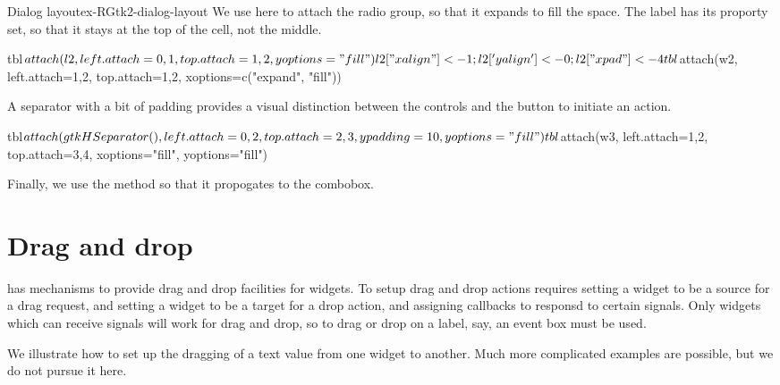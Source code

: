 \begin{example}{Dialog layout}{ex-RGtk2-dialog-layout}
We use  here to attach the radio group, so that it
expands to fill the space. The label has its  proporty
set, so that it stays at the top of the cell, not the middle.
\begin{Schunk}
\begin{Sinput}
 tbl$attach(l2, left.attach=0,1, top.attach=1,2, yoptions="fill")
 l2["xalign"] <- 1; l2['yalign'] <- 0; l2["xpad"] <- 4
 tbl$attach(w2, left.attach=1,2, top.attach=1,2, xoptions=c("expand", "fill"))
\end{Sinput}
\end{Schunk}
A separator with a bit of padding provides a visual distinction
between the controls and the button to initiate an action.
\begin{Schunk}
\begin{Sinput}
 tbl$attach(gtkHSeparator(),left.attach=0,2, top.attach=2,3, ypadding=10, yoptions="fill")
 tbl$attach(w3, left.attach=1,2, top.attach=3,4, xoptions="fill", yoptions="fill")
\end{Sinput}
\end{Schunk}
Finally, we use the  method so that it propogates to the combobox.
\begin{Schunk}
\end{Schunk}
\end{example}



\section{Drag and drop}
\label{sec:RGtk2:dnd}


\GTK\/ has mechanisms to provide drag and drop facilities for
widgets. To setup drag and drop actions requires setting a widget to
be a source for a drag request, and setting a widget to be a target
for a drop action, and assigning callbacks to responsd to certain
signals.  Only widgets which can receive signals will work for drag
and drop, so to drag or drop on a label, say, an event box must be
used. 

We illustrate how to set up the dragging of a text value from one
widget to another. Much more complicated examples are possible, but we
do not pursue it here.

